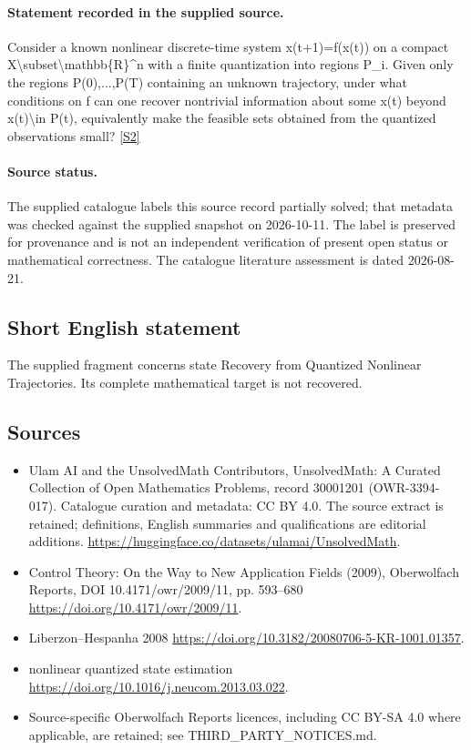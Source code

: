 \documentclass[11pt]{article}
\newcommand{\sref}[2]{\hyperlink{source:#1:#2}{[S#2]}}
\begin{document}
\paragraph{Statement recorded in the supplied source.}
Consider a known nonlinear discrete-time system x(t+1)=f(x(t)) on a compact X\textbackslash{}subset\textbackslash{}mathbb\{R\}\textasciicircum{}n with a finite quantization into regions P\_i. Given only the regions P(0),...,P(T) containing an unknown trajectory, under what conditions on f can one recover nontrivial information about some x(t) beyond x(t)\textbackslash{}in P(t), equivalently make the feasible sets obtained from the quantized observations small? \sref{30001201}{2}
\paragraph{Source status.}
The supplied catalogue labels this source record partially solved; that metadata was checked against the supplied snapshot on 2026-10-11. The label is preserved for provenance and is not an independent verification of present open status or mathematical correctness. The catalogue literature assessment is dated 2026-08-21.
\subsection{Short English statement}
The supplied fragment concerns state Recovery from Quantized Nonlinear Trajectories. Its complete mathematical target is not recovered.
\subsection{Sources}
\begin{itemize}
\item[\hypertarget{source:30001201:1}{S1}] Ulam AI and the UnsolvedMath Contributors, UnsolvedMath: A Curated Collection of Open Mathematics Problems, record 30001201 (OWR-3394-017). Catalogue curation and metadata: CC BY 4.0. The source extract is retained; definitions, English summaries and qualifications are editorial additions.
\url{https://huggingface.co/datasets/ulamai/UnsolvedMath}.
\item[\hypertarget{source:30001201:2}{S2}] Control Theory: On the Way to New Application Fields (2009), Oberwolfach Reports, DOI 10.4171/owr/2009/11, pp. 593--680
\url{https://doi.org/10.4171/owr/2009/11}.
\item[\hypertarget{source:30001201:3}{S3}] Liberzon--Hespanha 2008
\url{https://doi.org/10.3182/20080706-5-KR-1001.01357}.
\item[\hypertarget{source:30001201:4}{S4}] nonlinear quantized state estimation
\url{https://doi.org/10.1016/j.neucom.2013.03.022}.
\item Source-specific Oberwolfach Reports licences, including CC BY-SA 4.0 where applicable, are retained; see THIRD\_PARTY\_NOTICES.md.
\end{itemize}
\end{document}
